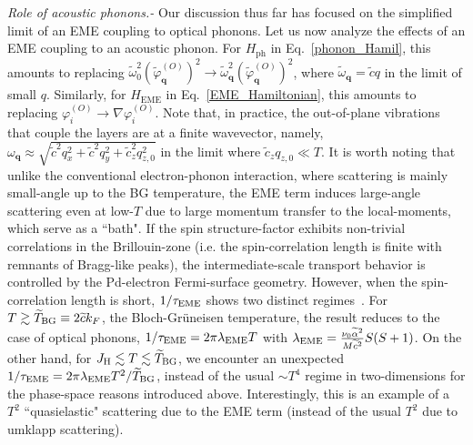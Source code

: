 \documentclass[aps,prl,twocolumn,superscriptaddress,amsmath,nofootinbib,10pt,floatfix]{revtex4-2}
\renewcommand{\vec}[1]{\boldsymbol{#1}}
\begin{document}
{\it Role of acoustic phonons.-} Our discussion thus far has focused on the simplified limit of an EME coupling to optical phonons. Let us now analyze the effects of an EME coupling to an acoustic phonon. For $H_{\text{ph}}$ in Eq.~\ref{phonon_Hamil}, this amounts to replacing $\widetilde{\omega}_0^2\left(\widetilde{\varphi}^{(O)}_{\vec{q}}\right)^{2}\rightarrow \widetilde{\omega}^2_{\boldsymbol{q}}\left(\widetilde{\varphi}^{(O)}_{\vec{q}}\right)^{2}$, where $\widetilde{\omega}_{\boldsymbol{q}}=\widetilde{c}q$ in the limit of small $q$. Similarly, for $H_{\text{EME}}$ in Eq.~\ref{EME_Hamiltonian}, this amounts to replacing $\varphi^{(O)}_i \to \nabla\varphi^{(O)}_i$. Note that, in practice, the out-of-plane vibrations that couple the layers are at a finite wavevector, namely, 
$\omega_{\boldsymbol{q}} \approx \sqrt{\widetilde{c}^2q_x^2+\widetilde{c}^2q_y^2+ \widetilde{c}_z^2q_{z,0}^2}$ in the limit where $\widetilde{c}_z q_{z,0}\ll T$.  
It is worth noting that unlike the conventional electron-phonon interaction, where scattering is mainly small-angle up to the BG temperature, the EME term induces large-angle scattering even at low-$T$ due to large momentum transfer to the local-moments, which serve as a ``bath". If the spin structure-factor exhibits non-trivial correlations in the Brillouin-zone (i.e. the spin-correlation length is finite with remnants of Bragg-like peaks), the intermediate-scale transport behavior is controlled by the Pd-electron Fermi-surface geometry. However, when the spin-correlation length is short, $1/\tau_{\rm EME}$ shows two distinct regimes~\cite{Supplementary_material}. For $T \gtrsim \widetilde{T}_{\rm BG}\equiv 2\widetilde{c}k_F$, the Bloch-Gr\"uneisen temperature, the result reduces to the case of optical phonons, $1/\tau_{\rm EME}=2\pi \lambda_{\rm EME}T$ with $\lambda_{\rm EME} = \frac{\nu_0 \widetilde{\alpha}^2}{M\widetilde{c}^2}S(S+1)$. On the other hand, for $J_{\rm H} \lesssim T \lesssim \widetilde{T}_{\rm BG}$, we encounter an unexpected $1/\tau_{\rm EME}=2\pi \lambda_{\rm EME}T^2/\widetilde{T}_{\rm BG}$, instead of the usual $\sim T^4$ regime in two-dimensions for the phase-space reasons introduced above. Interestingly, this is an example of a $T^2$ ``quasielastic" scattering due to the EME term (instead of the usual $T^2$ due to umklapp scattering). 
\end{document}
